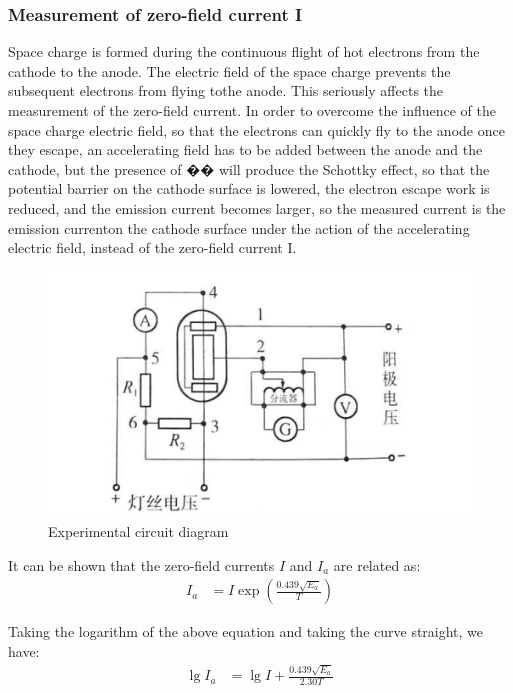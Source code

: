 \documentclass[UTF8]{article}
\begin{document}
   \subsubsection{Measurement of zero-field current I}
   Space charge is formed during the continuous flight of hot electrons from the cathode to the anode. The electric field of the space charge prevents the subsequent electrons from flying tothe anode. This seriously affects the measurement of the zero-field current. In order to overcome the influence of the space charge electric field, so that the electrons can quickly fly to the anode once they escape, an accelerating field has to be added between the anode and the cathode, but the presence of �� will produce the Schottky effect, so that the potential barrier on the cathode surface is lowered, the electron escape work is reduced, and the emission current becomes larger, so the measured current is the emission currenton the cathode surface under the action of the accelerating electric field, instead of the zero-field current I.
      	\begin{figure}[H]
              	\centering
              	\includegraphics[clip,scale=1,trim={0 0 0 0}]{fig/fig7.png}
                  \caption{Experimental circuit diagram}
                  \label{figure.7}
         \end{figure} 
         
   It can be shown that the zero-field currents $I$ and $I_a$ are related as:
   \begin{eqnarray}
   I_{a} & =I \exp \left(\frac{0.439 \sqrt{E_{a}}}{T}\right)
   \end{eqnarray}
   
   Taking the logarithm of the above equation and taking the curve straight, we have:
   \begin{eqnarray}
   \lg I_{a} & =\lg I+\frac{0.439 \sqrt{E_{a}}}{2.30 T}
   \end{eqnarray}
   
\end{document}
